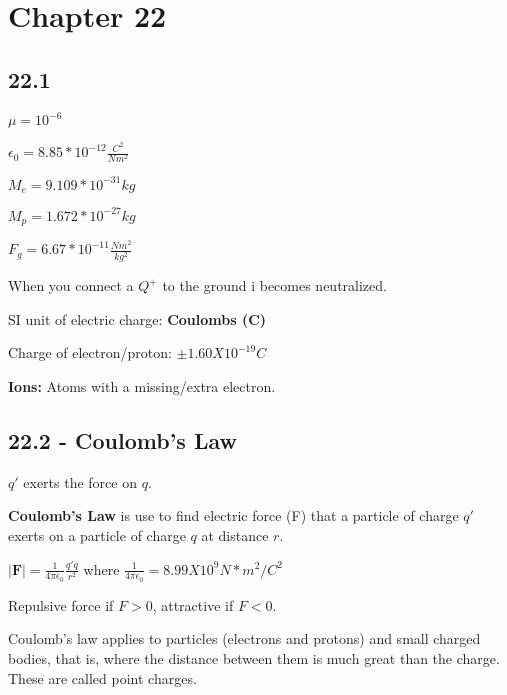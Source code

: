 \documentclass[twocolumn]{article}
\newenvironment{small_item}{
\begin{itemize}
  \setlength{\itemsep}{.25pt}
  \setlength{\parskip}{0pt}
  \setlength{\parsep}{0pt}
}{\end{itemize}}
\begin{document}
	
	\section*{Chapter 22} %
	\label{sec:chapter_22}
	
	\subsection*{22.1} %
	\label{sub:22_1}
	\begin{small_item}
		\item $\mu = 10^{-6}$
		\item $\epsilon_0 = 8.85*10^{-12}\frac{C^2}{Nm^2}$
		\item $M_e = 9.109 * 10^{-31}kg$
		\item $M_p = 1.672 * 10^{-27}kg$
		\item $F_g = 6.67 * 10^{-11}\frac{Nm^2}{kg^2}$
		\item When you connect a $Q^+$ to the ground i becomes neutralized.
		\item SI unit of electric charge: \textbf{Coulombs (C)}
		\item Charge of electron/proton: $\pm1.60 X 10^{-19}C$
		\item \textbf{Ions:} Atoms with a missing/extra electron.
	\end{small_item}
	
	\subsection*{22.2 - Coulomb's Law} %
	\label{sub:22_2}
	
	\begin{small_item}
		\item $q'$ exerts the force on $q$.
		\item \textbf{Coulomb's Law} is use to find electric force (F) that a particle of charge $q'$ exerts on a particle of charge $q$ at distance $r$.
		\item $\mathbf{|F|} = \frac{1}{4\pi\epsilon_{0}}\frac{q'q}{r^2}$ where $\frac{1}{4\pi\epsilon_{0}} = 8.99 X 10^9 N*m^2/C^2$
		\item Repulsive force if $F > 0$, attractive if $F < 0$.
		\item Coulomb's law applies to particles (electrons and protons) and small charged bodies, that is, where the distance between them is much great than the charge.  These are called point charges.
	\end{small_item}
	
\end{document}
